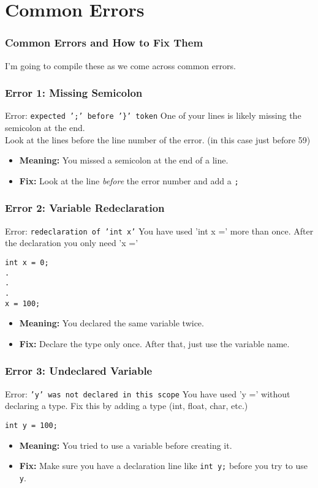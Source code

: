 \documentclass{beamer}
\begin{document}
\section{Common Errors}

\begin{frame}
\frametitle{Common Errors and How to Fix Them}
I'm going to compile these as we come across common errors.
\end{frame}

\begin{frame}
\frametitle{Error 1: Missing Semicolon}
\begin{alertblock}{Error: \texttt{expected ';' before '\}' token}}
One of your lines is likely missing the semicolon at the end.\\
Look at the lines before the line number of the error. (in this case just before 59)
\end{alertblock}
\begin{itemize}
    \item \textbf{Meaning:} You missed a semicolon at the end of a line.
    \item \textbf{Fix:} Look at the line \textit{before} the error number and add a \texttt{;}
\end{itemize}
\end{frame}

\begin{frame}[fragile]
\frametitle{Error 2: Variable Redeclaration}
\begin{alertblock}{Error: \texttt{redeclaration of 'int x'}}
You have used 'int x =' more than once. After the declaration you only need 'x ='
\end{alertblock}
\begin{verbatim}
int x = 0;
.
.
.
x = 100;
\end{verbatim}
\begin{itemize}
    \item \textbf{Meaning:} You declared the same variable twice.
    \item \textbf{Fix:} Declare the type only once. After that, just use the variable name.
\end{itemize}
\end{frame}

\begin{frame}[fragile]
\frametitle{Error 3: Undeclared Variable}
\begin{alertblock}{Error: \texttt{'y' was not declared in this scope}}
You have used 'y =' without declaring a type. Fix this by adding a type (int, float, char, etc.)
\end{alertblock}
\begin{verbatim}
int y = 100;
\end{verbatim}
\begin{itemize}
    \item \textbf{Meaning:} You tried to use a variable before creating it.
    \item \textbf{Fix:} Make sure you have a declaration line like \texttt{int y;} before you try to use \texttt{y}.
\end{itemize}
\end{frame}
\end{document}
